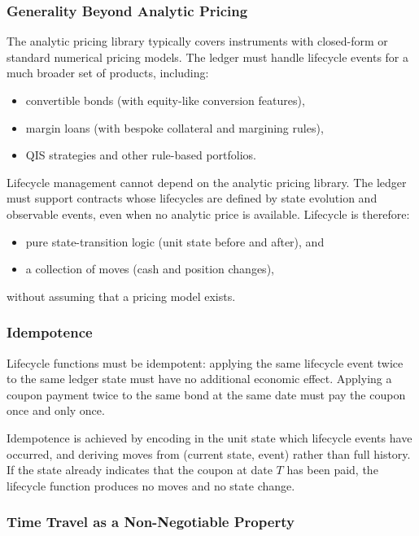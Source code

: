 \documentclass[11pt,a4paper]{article}
\begin{document}
\subsubsection{Generality Beyond Analytic Pricing}

The analytic pricing library typically covers instruments with closed-form or standard numerical pricing models. The ledger must handle lifecycle events for a much broader set of products, including:

\begin{itemize}[nosep]
\item convertible bonds (with equity-like conversion features),
\item margin loans (with bespoke collateral and margining rules),
\item QIS strategies and other rule-based portfolios.
\end{itemize}

Lifecycle management cannot depend on the analytic pricing library. The ledger must support contracts whose lifecycles are defined by state evolution and observable events, even when no analytic price is available. Lifecycle is therefore:

\begin{itemize}[nosep]
\item pure state-transition logic (unit state before and after), and
\item a collection of moves (cash and position changes),
\end{itemize}

\noindent without assuming that a pricing model exists.

\subsubsection{Idempotence}

Lifecycle functions must be idempotent: applying the same lifecycle event twice to the same ledger state must have no additional economic effect. Applying a coupon payment twice to the same bond at the same date must pay the coupon once and only once.

Idempotence is achieved by encoding in the unit state which lifecycle events have occurred, and deriving moves from (current state, event) rather than full history. If the state already indicates that the coupon at date $T$ has been paid, the lifecycle function produces no moves and no state change.

\subsubsection{Time Travel as a Non-Negotiable Property}
\end{document}
